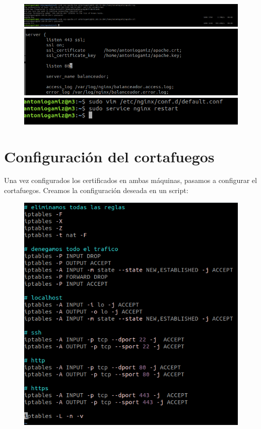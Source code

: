 \documentclass[12pt]{article}
\begin{document}
\begin{figure}[H]
\center
\includegraphics[scale=0.4,width=\textwidth]{14.png}
\includegraphics[scale=0.5]{15.png}
\includegraphics[scale=0.5]{16.png}
\end{figure}

\section{Configuración del cortafuegos}

Una vez configurados los certificados en ambas máquinas, pasamos a configurar el cortafuegos. Creamos la configuración deseada en un script:

\begin{figure}[H]
\center
\includegraphics[scale=0.5]{18.png}
\end{figure}
\end{document}
